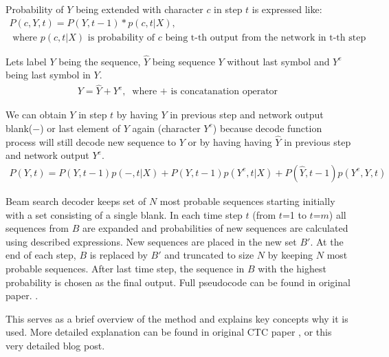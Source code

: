 \documentclass[times, utf8, diplomski, numeric, english]{fer}
\begin{document}
Probability of $Y$ being extended with character $c$ in step $t$ is expressed like:
\begin{equation}
\begin{gathered}
P(c, Y, t) = P(Y, t-1) * p(c, t|X), \\\text{~where $p(c, t|X)$ is probability of $c$ being t-th output from the network in t-th step}.
\end{gathered}
\end{equation}

Lets label $Y$ being the sequence, $\hat{Y}$ being sequence $Y$ without last symbol and $Y^e$ being last symbol in $Y$.
\begin{equation}
\begin{gathered}
Y = \hat{Y} + Y^e, \text{~where $+$ is concatanation operator}
\end{gathered}
\end{equation}

We can obtain $Y$ in step $t$ by having $Y$ in previous step and network output blank($-$) or last element of $Y$ again (character $Y^e$) because decode function process will still decode new sequence to $Y$ or by having having $\hat{Y}$ in previous step and network output $Y^e$.
\begin{equation}
\begin{gathered}
P(Y, t) = P(Y, t-1) p(-, t|X) +  P(Y, t-1)  p(Y^e, t|X) +  P(\hat{Y}, t-1)  p(Y^e, Y, t) 
\end{gathered}
\end{equation}

Beam search decoder keeps set of $N$ most probable sequences starting initially with a set consisting of a single blank. In each time step $t$ (from $t$=1 to $t$=$m$) all sequences from $B$ are expanded and probabilities of new sequences are calculated using described expressions. New sequences are placed in the new set $B'$. At the end of each step, $B$ is replaced by $B'$ and truncated to size $N$ by keeping $N$ most probable sequences. 
After last time step, the sequence in $B$ with the highest probability is chosen as the final output. 
Full pseudocode can be found in original paper\cite{graves_decode}.  .


This serves as a brief overview of the method and explains key concepts why it is used. More detailed explanation can be found in original CTC paper \cite{Graves:2006:CTC:1143844.1143891}, or this very detailed blog post\cite{ctc-blog}.
\end{document}
